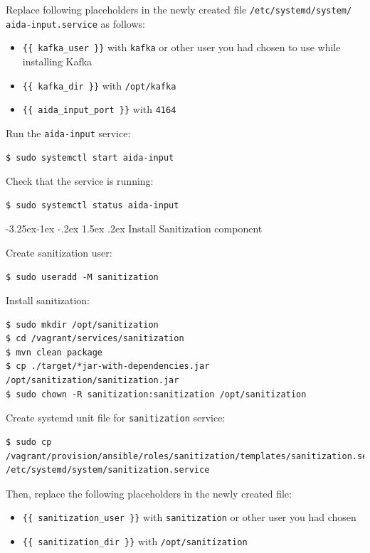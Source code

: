 \documentclass[a4paper]{article} %
\makeatletter
\renewcommand{\normalsize}{\fontsize{12}{15}\selectfont\color{textcolor}}
\renewcommand\subsubsection{\@startsection{subsubsection}{3}{\z@}%
                   {-3.25ex\@plus -1ex \@minus -.2ex}%
                   {1.5ex \@plus .2ex}%
                   {\normalfont\sffamily\normalsize\bfseries\color{projectcolor}}}
\makeatother
\begin{document}
Replace following placeholders in the newly created file \texttt{/etc/systemd/system/\\aida-input.service} as follows:
\begin{itemize}[noitemsep,nolistsep]
\item \texttt{\{\{ kafka\_user \}\}} with \texttt{kafka} or other user you had chosen to use while installing Kafka
\item \texttt{\{\{ kafka\_dir \}\}} with \texttt{/opt/kafka}
\item \texttt{\{\{ aida\_input\_port \}\}} with \texttt{4164}
\end{itemize}

Run the \texttt{aida-input} service:
\begin{lstlisting}
$ sudo systemctl start aida-input
\end{lstlisting}

Check that the service is running:
\begin{lstlisting}
$ sudo systemctl status aida-input
\end{lstlisting}


\subsubsection{Install Sanitization component}

Create sanitization user:
\begin{lstlisting}
$ sudo useradd -M sanitization
\end{lstlisting}

Install sanitization:
\begin{lstlisting}
$ sudo mkdir /opt/sanitization
$ cd /vagrant/services/sanitization
$ mvn clean package
$ cp ./target/*jar-with-dependencies.jar /opt/sanitization/sanitization.jar
$ sudo chown -R sanitization:sanitization /opt/sanitization
\end{lstlisting}

Create systemd unit file for \texttt{sanitization} service:
\begin{lstlisting}
$ sudo cp /vagrant/provision/ansible/roles/sanitization/templates/sanitization.service.j2 /etc/systemd/system/sanitization.service
\end{lstlisting}

Then, replace the following placeholders in the newly created file:
\begin{itemize}[noitemsep,nolistsep]
\item \texttt{\{\{ sanitization\_user \}\}} with \texttt{sanitization} or other user you had chosen
\item \texttt{\{\{ sanitization\_dir \}\}} with \texttt{/opt/sanitization}
\end{itemize}
\end{document}
